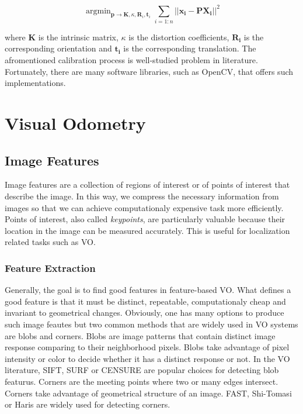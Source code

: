 \documentclass[a4paper]{report}
\numberwithin{figure}{section}
\newcommand{\argmin}{\mathop{\mathrm{argmin}}}
\begin{document}
\begin{equation}
  \argmin_{\mathbf{p} \rightarrow \mathbf{K}, \kappa, \mathbf{R}_i, \mathbf{t}_i}
  \sum_{i=1:n} || \mathbf{x_{i}} - 
  \mathbf{P} \mathbf{X_{i}} ||^2
\end{equation}

where $\mathbf{K}$ is the intrinsic matrix, 
$\kappa$ is the distortion coefficients, 
$\mathbf{R_i}$ is the corresponding orientation and 
$\mathbf{t_i}$ is the corresponding translation.
The afromentioned calibration process is well-studied problem in literature. 
Fortunately, there are many software libraries, such as OpenCV, 
that offers such implementations.



\chapter{Visual Odometry} \label{cp_vo}

\section{Image Features} \label{sc_img_features}

Image features are a collection of regions of interest or of points of interest 
that describe the image. In this way, we compress the necessary information 
from images so that we can achieve computationaly expensive task more efficiently.
Points of interest, also called \textit{keypoints}, 
are particularly valuable because their location in the image can be 
measured accurately. This is useful for localization related tasks such as VO. 

\subsection{Feature Extraction} \label{sb_sc_feature_extraction}

Generally, the goal is to find good features in feature-based VO. 
What defines a good feature is that it must be distinct, 
repeatable, computationaly cheap and invariant to geometrical changes. 
Obviously, one has many options to produce such image 
feautes but two common methods that are widely used in VO systems are 
blobs and corners. 
Blobs are image patterns that contain distinct image response comparing to their 
neighborhood pixels. Blobs take advantage of pixel intensity or color to 
decide whether it has a distinct response or not.
In the VO literature, SIFT\cite{}, SURF\cite{} or CENSURE\cite{} are popular 
choices for detecting blob featurus.
Corners are the meeting points where two or many edges intersect. Corners 
take advantage of geometrical structure of an image. FAST\cite{}, Shi-Tomasi or 
Haris\cite{} are widely used for detecting corners.
\end{document}
